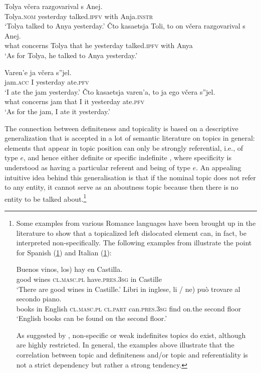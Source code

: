 \documentclass[output=paper,colorlinks,citecolor=brown]{langscibook}
\begin{document}
\ea
\ea \gll	Tolya v\v{c}era 				razgovarival s 				Anej. \label{tolya} \\
		Tolya.\textsc{nom} yesterday 	talked.\textsc{ipfv} 			with	Anja.\textsc{instr} 	\\
\glt	`Tolya talked to Anya yesterday.' 
\ex \gll \v{C}to		kasaetsja	Toli, 		to 		on	v\v{c}era 			razgovarival s 				Anej.\\
		what 	concerns 	Tolya 	that	he	yesterday	talked.\textsc{ipfv} 			with	Anya \\
\glt `As for Tolya, he talked to Anya yesterday.'
\z
\z

\ea
\ea \gll	Varen'e	ja	v\v{c}era 			s''jel. \label{varenje} \\
		jam.\textsc{acc}			I 		yesterday 	ate.\textsc{pfv}	\\	
	\glt `I ate the jam yesterday.'
\ex \gll \v{C}to 		kasaetsja	varen'a, to 		ja	ego v\v{c}era 				s''jel.\\
		what 	concerns 	jam 				that I 		it 		yesterday ate.\textsc{pfv} \\
\glt `As for the jam, I ate it yesterday.'
\z
\z

\noindent The connection between definiteness and topicality is based on a descriptive generalization that is accepted in a lot of semantic literature on topics in general: elements that appear in topic position can only be strongly referential, i.e., of type {$e$}, and hence either definite or specific indefinite \citep[see, for instance][]{reinhart81, erteshir98, portneryabushita01, endriss09}, where specificity is understood as having a particular referent and being of type {$e$}. An appealing intuitive idea behind this generalisation is that if the nominal topic does not refer to any entity, it  cannot serve as an aboutness topic because then there is no entity to be talked about.\footnote{\label{fn:leonetti}Some examples from various Romance languages have been brought up in the literature to show that a topicalized left dislocated element can, in fact, be interpreted non-specifically. The following examples from \citet{leonetti10} illustrate the point for Spanish (\ref{vinos}) and Italian (\ref{libri}): 

\ea 
\ea \gll 	Buenos	vinos, \minsp{(} los) 							hay 								en	Castilla. \label{vinos} \\
		good 			wines {} \textsc{cl.masc.pl} 	have.\textsc{pres.3sg}  	in 	Castille \\
\glt `There are good wines in Castille.'
\ex \gll Libri 		in	inglese,	\minsp{(} li 								/ 	ne) 					pu\`{o} 	trovare		al 	 secondo		piano.  \label{libri}\\
	books 	in 	English {} \textsc{cl.masc.pl} {} \textsc{cl.part}		can.\textsc{pres.3sg}  	find			on.the	second 	floor \\
\glt `English books can be found on the second floor.'
\z
\z

\noindent As suggested by \citet{leonetti10}, non-specific or weak indefinites topics do exist, although are highly restricted. 
In general, the examples above illustrate that the correlation between topic and definiteness and/or topic and referentiality is not a strict dependency but rather a strong tendency.}
\end{document}
